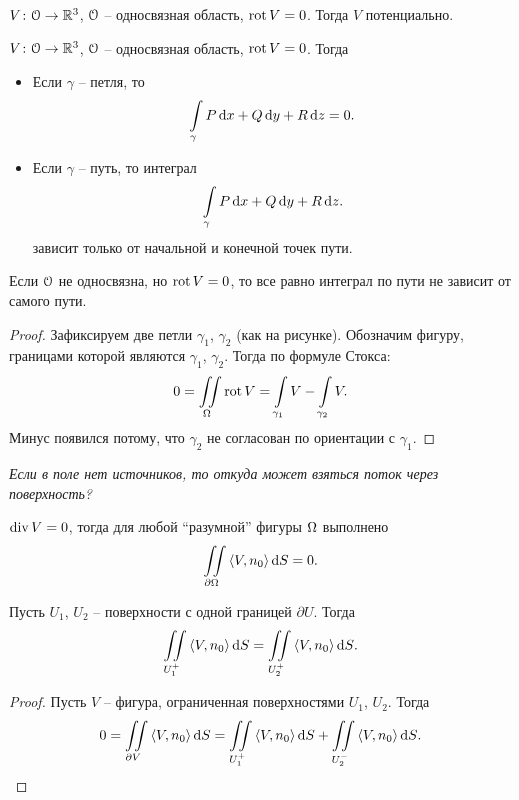 \begin{remark}
    $V \colon \mathcal{O} \to \mathbb{R}^3$, $\mathcal{O}$ -- односвязная область, $\operatorname{rot} V = 0$. Тогда $V$ потенциально.
\end{remark}

\begin{remark}
    $V \colon \mathcal{O} \to \mathbb{R}^3$, $\mathcal{O}$ -- односвязная область, $\operatorname{rot} V = 0$. Тогда
    \begin{itemize}
        \item Если $\gamma$ -- петля, то
\[
    \int\limits_{\gamma}{P \,\mathrm{d} x + Q \,\mathrm{d} y + R \,\mathrm{d} z} = 0
.\] 
        \item Если $\gamma$ -- путь, то интеграл
\[
    \int\limits_{\gamma}{P \,\mathrm{d} x + Q \,\mathrm{d} y + R \,\mathrm{d} z}
.\] 
            зависит только от начальной и конечной точек пути.
    \end{itemize} 
\end{remark}

\begin{remark}
    Если $\mathcal{O}$ не односвязна, но $\operatorname{rot} V = 0$, то все равно интеграл по пути
    не зависит от самого пути.
\end{remark}
\begin{proof}
    Зафиксируем две петли $\gamma_1$, $\gamma_2$ (как на рисунке). Обозначим фигуру, границами которой являются
    $\gamma_1$, $\gamma_2$. Тогда по формуле Стокса:
    \[
        0 = \iint\limits_\Omega{\operatorname{rot}{V}} = \int\limits_{\gamma_1}{V} - \int\limits_{\gamma_2}{V}
    .\]
    Минус появился потому, что $\gamma_2$ не согласован по ориентации с $\gamma_1$.
\end{proof}

\textit{Если в поле нет источников, то откуда может взяться поток через поверхность?}
\begin{remark}
    $\operatorname{div} V = 0$, тогда для любой ``разумной'' фигуры $\Omega$ выполнено
\[
    \iint\limits_{\partial \Omega}{\langle V, n_0 \rangle \,\mathrm{d} S} = 0
.\] 
\end{remark}

\begin{remark}
    Пусть $U_1$, $U_2$ -- поверхности с одной границей $\partial U$. Тогда
    \[
        \iint\limits_{U_1^+}{\langle V, n_0 \rangle \,\mathrm{d} S} = \iint\limits_{U_2^+}{\langle V, n_0 \rangle \,\mathrm{d} S}
    .\]
\end{remark}
\begin{proof}
    Пусть $V$ -- фигура, ограниченная поверхностями $U_1$, $U_2$. Тогда
    \[
        0 = \iint\limits_{\partial V}{\langle V, n_0 \rangle \,\mathrm{d} S} = \iint\limits_{U_1^+}{\langle V, n_0 \rangle \,\mathrm{d} S}
        + \iint\limits_{U_2^-}{\langle V, n_0 \rangle \,\mathrm{d} S}
    .\]
\end{proof}

